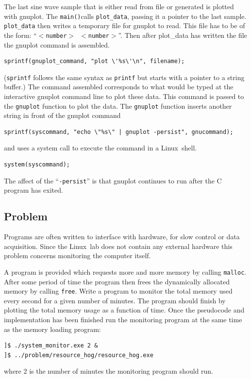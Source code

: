 \documentclass[11pt]{scrartcl}
\def\main{\texttt{main()}}
\def\linux{Linux}
\begin{document}
The last sine wave sample that is either read from file or generated
is plotted with gnuplot.  The \main calls \texttt{plot\_data}, passing
it a pointer to the last sample.   \texttt{plot\_data} then writes a
temporary file for gnuplot to read.  This file has to be of the form:
``\texttt{$<$number$>$ $<$number$>$}''.  Then after plot\_data has
written the file the gnuplot command is assembled.
\begin{lstlisting}
sprintf(gnuplot_command, "plot \'%s\'\n", filename);
\end{lstlisting}
(\texttt{sprintf} follows the same syntax as \texttt{printf} but starts
with a pointer to a string buffer.)  The command assembled corresponds
to what would be typed at the interactive gnuplot command line to plot
these data.  This command is passed to the \texttt{gnuplot} function
to plot the data.  The \texttt{gnuplot} function inserts another
string in front of the gnuplot command
\begin{lstlisting}
sprintf(syscommand, "echo \"%s\" | gnuplot -persist", gnucommand);
\end{lstlisting}
and uses a system call to execute the command in a \linux\ shell.
\begin{lstlisting}
system(syscommand);
\end{lstlisting}
The affect of the ``\texttt{-persist}'' is that gnuplot continues to
run after the C program has exited. 

\clearpage
\newpage

\subsection{Problem}
Programs are often written to interface with hardware, for slow control or 
data acquisition.  Since the \linux\ lab does not contain any external 
hardware this problem concerns monitoring the computer itself.

A program is provided which requests more and more memory by calling
\texttt{malloc}.  After some period of time the program then frees the
dynamically allocated memory by calling \texttt{free}.  Write a
program to monitor the total memory used every second for a given
number of minutes.  The program should finish by plotting the total
memory usage as a function of time.  Once the pseudocode and
implementation has been finished run the monitoring program at the
same time as the memory loading program:
\begin{verbatim}
]$ ./system_monitor.exe 2 &
]$ ../problem/resource_hog/resource_hog.exe
\end{verbatim}
where 2 is the number of minutes the monitoring program should run.
\end{document}
